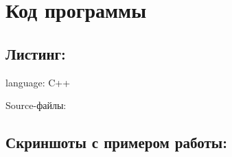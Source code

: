 \documentclass[fleqn]{article}
\begin{document}
\newpage

\section{Код программы}

\subsection{Листинг:}

language: C++







Source-файлы:







\subsection{Скриншоты с примером работы:}

\end{document}
